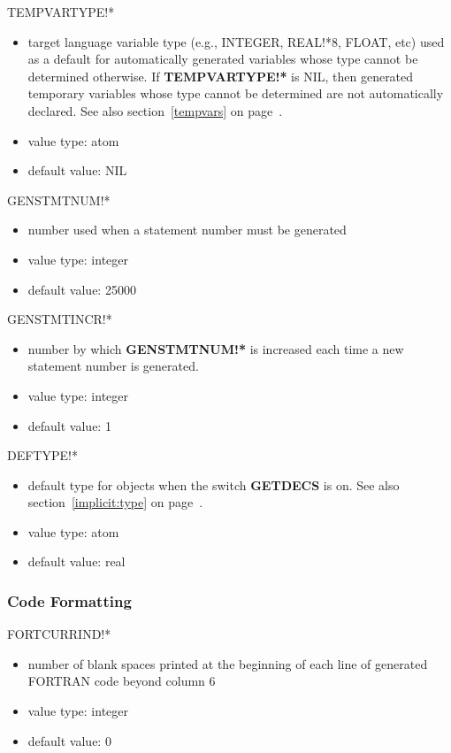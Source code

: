 \begin{describe}{TEMPVARTYPE!*}
\begin{itemize}
\item target language variable type (e.g., INTEGER, REAL!*8, FLOAT, etc) used
as a default for automatically generated variables whose type cannot be
determined otherwise.  If {\bf TEMPVARTYPE!*} is NIL, then generated
temporary variables whose type cannot be determined are not automatically
declared.  See also section~\ref{tempvars} on page~\pageref{tempvars}.
\item value type:  atom
\item default value:  NIL
\end{itemize}
\end{describe}

\begin{describe}{GENSTMTNUM!*}
\begin{itemize}
\item number used when a statement number must be generated
\item value type:  integer
\item default value:  25000
\end{itemize}
\end{describe}

\begin{describe}{GENSTMTINCR!*}
\begin{itemize}
\item number by which {\bf GENSTMTNUM!*} is increased each time a new
statement number is generated.
\item value type:  integer
\item default value:  1
\end{itemize}
\end{describe}

\begin{describe}{DEFTYPE!*}
\begin{itemize}
\item default type for objects when the switch {\bf GETDECS} is on.  See also
section~\ref{implicit:type} on page~\pageref{implicit:type}.
\item value type: atom
\item default value: real
\end{itemize}
\end{describe}

\subsubsection{Code Formatting}
\begin{describe}{FORTCURRIND!*}
\begin{itemize}
\item number of blank spaces printed at the beginning of each line of
generated FORTRAN code beyond column 6
\item value type:  integer
\item default value:  0
\end{itemize}
\end{describe}

